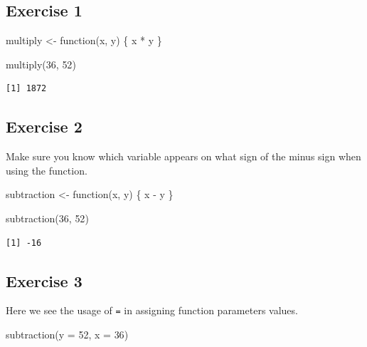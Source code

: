 \documentclass[
  letterpaper,
  DIV=11,
  numbers=noendperiod]{scrreprt}
\newenvironment{Shaded}{\begin{snugshade}}{\end{snugshade}}
\newcommand{\AttributeTok}[1]{\textcolor[rgb]{0.40,0.45,0.13}{#1}}
\newcommand{\ControlFlowTok}[1]{\textcolor[rgb]{0.00,0.23,0.31}{#1}}
\newcommand{\DecValTok}[1]{\textcolor[rgb]{0.68,0.00,0.00}{#1}}
\newcommand{\FunctionTok}[1]{\textcolor[rgb]{0.28,0.35,0.67}{#1}}
\newcommand{\NormalTok}[1]{\textcolor[rgb]{0.00,0.23,0.31}{#1}}
\newcommand{\OtherTok}[1]{\textcolor[rgb]{0.00,0.23,0.31}{#1}}
\newcommand{\SpecialCharTok}[1]{\textcolor[rgb]{0.37,0.37,0.37}{#1}}
\begin{document}
\subsection{Exercise 1}\label{exercise-1-1}

\begin{Shaded}
\begin{Highlighting}[]
\NormalTok{multiply }\OtherTok{\textless{}{-}} \ControlFlowTok{function}\NormalTok{(x, y) \{}
\NormalTok{  x }\SpecialCharTok{*}\NormalTok{ y}
\NormalTok{\}}

\FunctionTok{multiply}\NormalTok{(}\DecValTok{36}\NormalTok{, }\DecValTok{52}\NormalTok{)}
\end{Highlighting}
\end{Shaded}

\begin{verbatim}
[1] 1872
\end{verbatim}

\subsection{Exercise 2}\label{exercise-2}

Make sure you know which variable appears on what sign of the minus sign
when using the function.

\begin{Shaded}
\begin{Highlighting}[]
\NormalTok{subtraction }\OtherTok{\textless{}{-}} \ControlFlowTok{function}\NormalTok{(x, y) \{}
\NormalTok{  x }\SpecialCharTok{{-}}\NormalTok{ y}
\NormalTok{\}}

\FunctionTok{subtraction}\NormalTok{(}\DecValTok{36}\NormalTok{, }\DecValTok{52}\NormalTok{)}
\end{Highlighting}
\end{Shaded}

\begin{verbatim}
[1] -16
\end{verbatim}

\subsection{Exercise 3}\label{exercise-3}

Here we see the usage of \texttt{=} in assigning function parameters
values.

\begin{Shaded}
\begin{Highlighting}[]
\FunctionTok{subtraction}\NormalTok{(}\AttributeTok{y =} \DecValTok{52}\NormalTok{, }\AttributeTok{x =} \DecValTok{36}\NormalTok{)}
\end{Highlighting}
\end{Shaded}
\end{document}
